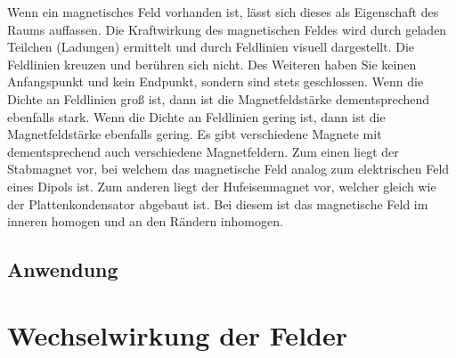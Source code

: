Wenn ein magnetisches Feld vorhanden ist, lässt sich dieses als Eigenschaft des Raums auffassen.
Die Kraftwirkung des magnetischen Feldes wird durch geladen Teilchen (Ladungen) ermittelt und durch Feldlinien visuell dargestellt.
Die Feldlinien kreuzen und berühren sich nicht.
Des Weiteren haben Sie keinen Anfangspunkt und kein Endpunkt, sondern sind stets geschlossen.
Wenn die Dichte an Feldlinien groß ist, dann ist die Magnetfeldstärke dementsprechend ebenfalls stark.
Wenn die Dichte an Feldlinien gering ist, dann ist die Magnetfeldstärke ebenfalls gering.
Es gibt verschiedene Magnete mit dementsprechend auch verschiedene Magnetfeldern. 
Zum einen liegt der Stabmagnet vor, bei welchem das magnetische Feld analog zum elektrischen Feld eines Dipols ist.
Zum anderen liegt der Hufeisenmagnet vor, welcher gleich wie der Plattenkondensator abgebaut ist.
Bei diesem ist das magnetische Feld im inneren homogen und an den Rändern inhomogen. 
\subsection{Anwendung}
\section{Wechselwirkung der Felder}%
